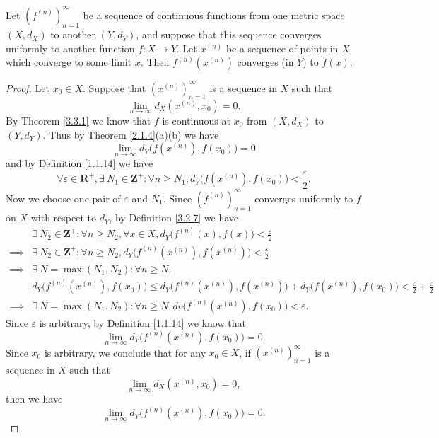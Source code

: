 \begin{proposition}\label{3.3.4}
    Let \((f^{(n)})_{n = 1}^\infty\) be a sequence of continuous functions from one metric space \((X, d_X)\) to another \((Y, d_Y)\), and suppose that this sequence converges uniformly to another function \(f : X \to Y\).
    Let \(x^{(n)}\) be a sequence of points in \(X\) which converge to some limit \(x\).
    Then \(f^{(n)}(x^{(n)})\) converges (in \(Y\)) to \(f(x)\).
\end{proposition}

\begin{proof}
    Let \(x_0 \in X\).
    Suppose that \((x^{(n)})_{n = 1}^\infty\) is a sequence in \(X\) such that
    \[
        \lim_{n \to \infty} d_X(x^{(n)}, x_0) = 0.
    \]
    By Theorem \ref{3.3.1} we know that \(f\) is continuous at \(x_0\) from \((X, d_X)\) to \((Y, d_Y)\).
    Thus by Theorem \ref{2.1.4}(a)(b) we have
    \[
        \lim_{n \to \infty} d_Y\big(f(x^{(n)}), f(x_0)\big) = 0
    \]
    and by Definition \ref{1.1.14} we have
    \[
        \forall \varepsilon \in \mathbf{R}^+, \exists\ N_1 \in \mathbf{Z}^+ : \forall n \geq N_1, d_Y\big(f(x^{(n)}), f(x_0)\big) < \frac{\varepsilon}{2}.
    \]
    Now we choose one pair of \(\varepsilon\) and \(N_1\).
    Since \((f^{(n)})_{n = 1}^\infty\) converges uniformly to \(f\) on \(X\) with respect to \(d_Y\), by Definition \ref{3.2.7} we have
    \begin{align*}
                 & \exists\ N_2 \in \mathbf{Z}^+ : \forall n \geq N_2, \forall x \in X, d_Y\big(f^{(n)}(x), f(x)\big) < \frac{\varepsilon}{2}                                             \\
        \implies & \exists\ N_2 \in \mathbf{Z}^+ : \forall n \geq N_2, d_Y\big(f^{(n)}(x^{(n)}), f(x^{(n)})\big) < \frac{\varepsilon}{2}                                                  \\
        \implies & \exists\ N = \max(N_1, N_2) : \forall n \geq N,                                                                                                                        \\
                 & d_Y\big(f^{(n)}(x^{(n)}), f(x_0)\big) \leq d_Y\big(f^{(n)}(x^{(n)}), f(x^{(n)})\big) + d_Y\big(f(x^{(n)}), f(x_0)\big) < \frac{\varepsilon}{2} + \frac{\varepsilon}{2} \\
        \implies & \exists\ N = \max(N_1, N_2) : \forall n \geq N, d_Y\big(f^{(n)}(x^{(n)}), f(x_0)\big) < \varepsilon.
    \end{align*}
    Since \(\varepsilon\) is arbitrary, by Definition \ref{1.1.14} we know that
    \[
        \lim_{n \to \infty} d_Y\big(f^{(n)}(x^{(n)}), f(x_0)\big) = 0.
    \]
    Since \(x_0\) is arbitrary, we conclude that for any \(x_0 \in X\), if \((x^{(n)})_{n = 1}^\infty\) is a sequence in \(X\) such that
    \[
        \lim_{n \to \infty} d_X(x^{(n)}, x_0) = 0,
    \]
    then we have
    \[
        \lim_{n \to \infty} d_Y\big(f^{(n)}(x^{(n)}), f(x_0)\big) = 0.
    \]
\end{proof}

